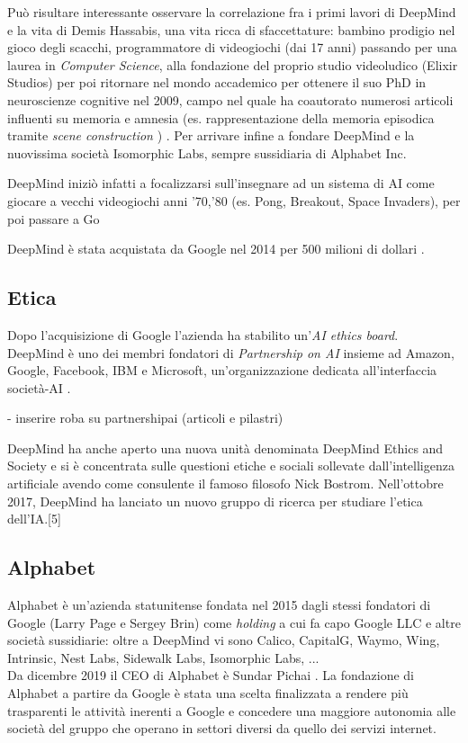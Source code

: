 Può risultare interessante osservare la correlazione fra i primi lavori di DeepMind e la vita di Demis Hassabis, una vita ricca di sfaccettature: bambino prodigio nel gioco degli scacchi, programmatore di videogiochi (dai 17 anni) passando per una laurea in \textit{Computer Science}, alla fondazione del proprio studio videoludico (Elixir Studios) per poi ritornare nel mondo accademico per ottenere il suo PhD in neuroscienze cognitive nel 2009, campo nel quale ha coautorato numerosi articoli influenti su memoria e amnesia (es. rappresentazione della memoria episodica tramite \textit{scene construction} \cite{Hassabis2007Jul}) \cite{hassabisWiki}. Per arrivare infine a fondare DeepMind e la nuovissima società Isomorphic Labs, sempre sussidiaria di Alphabet Inc.

\par DeepMind iniziò infatti a focalizzarsi sull'insegnare ad un sistema di AI come giocare a vecchi videogiochi anni '70,'80 (es. Pong, Breakout, Space Invaders), per poi passare a Go

DeepMind è stata acquistata da Google nel 2014 per 500 milioni di dollari \cite{Guardian2014}.

\subsection{Etica}
Dopo l'acquisizione di Google l'azienda ha stabilito un'\textit{AI ethics board}.\\
DeepMind è uno dei membri fondatori di \textit{Partnership on AI} insieme ad Amazon, Google, Facebook, IBM e Microsoft, un'organizzazione dedicata all'interfaccia società-AI \cite{partnershiponai}.

- inserire roba su partnershipai (articoli e pilastri)

DeepMind ha anche aperto una nuova unità denominata DeepMind Ethics and Society e si è concentrata sulle questioni etiche e sociali sollevate dall'intelligenza artificiale avendo come consulente il famoso filosofo Nick Bostrom. Nell'ottobre 2017, DeepMind ha lanciato un nuovo gruppo di ricerca per studiare l'etica dell'IA.[5]

\subsection{Alphabet}
Alphabet è un'azienda statunitense fondata nel 2015 dagli stessi fondatori di Google (Larry Page e Sergey Brin) come \textit{holding} a cui fa capo Google LLC e altre società sussidiarie: oltre a DeepMind vi sono Calico, CapitalG, Waymo, Wing, Intrinsic, Nest Labs, Sidewalk Labs, Isomorphic Labs, ...\\ 
Da dicembre 2019 il CEO di Alphabet è Sundar Pichai \cite{cnbc}.
La fondazione di Alphabet a partire da Google è stata una scelta finalizzata a rendere più trasparenti le attività inerenti a Google e concedere una maggiore autonomia alle società del gruppo che operano in settori diversi da quello dei servizi internet.


